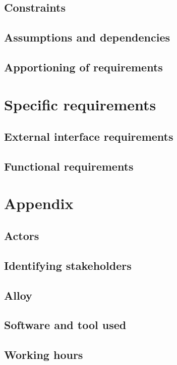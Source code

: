 \documentclass[]{report}
\begin{document}
\section{Constraints}


\section{Assumptions and dependencies}


\section{Apportioning of requirements}


\chapter{Specific requirements}

\section{External interface requirements}


\section{Functional requirements}




\appendix

\chapter{Appendix}

\section{Actors}


\section{Identifying stakeholders}


\section{Alloy}


\section{Software and tool used}


\section{Working hours}

\end{document}
